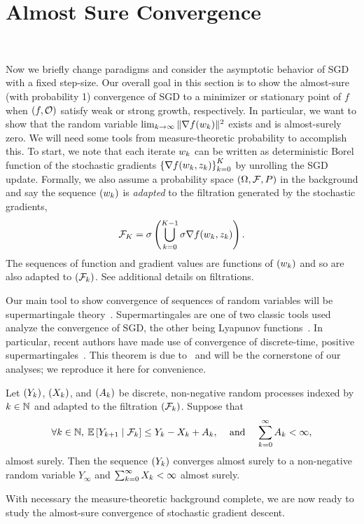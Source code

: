 \section{Almost Sure Convergence}~\label{sec:almost-sure}

Now we briefly change paradigms and consider the asymptotic behavior of SGD with a fixed step-size.
Our overall goal in this section is to show the almost-sure (with probability 1) convergence of SGD to a minimizer or stationary point of \( f \) when \( \rbr{f, \oracle{}} \) satisfy weak or strong growth, respectively.
In particular, we want to show that the random variable \( \lim_{\iter \rightarrow \infty} \norm{\grad(\wk)}^2 \) exists and is almost-surely zero.
We will need some tools from measure-theoretic probability to accomplish this.
To start, we note that each iterate \( \w_k \) can be written as deterministic Borel function of the stochastic gradients \( \cbr{\grad(\wk, \zk)}_{\iter=0}^{K} \) by unrolling the SGD update.
Formally, we also assume a probability space \( \rbr{\Omega,  \calF, P} \) in the background and say the sequence \( \seq{\wk} \) is \emph{adapted} to the filtration generated by the stochastic gradients,
\begin{align*}
    \calF_K = \sigma \rbr{\bigcup_{\iter = 0}^{K-1} \sigma \grad(\wk, \zk)}.
\end{align*}
The sequences of function and gradient values are functions of \( \seq{\wk} \) and so are also adapted to \( \seq{\calF_\iter} \).
See \citet{ccinlar2011probability} additional details on filtrations.

Our main tool to show convergence of sequences of random variables will be supermartingale theory~\citep{ccinlar2011probability}.
Supermartingales are one of two classic tools used analyze the convergence of SGD, the other being Lyapunov functions~\citep{bertsekas2000gradient}.
In particular, recent authors have made use of convergence of discrete-time, positive supermartingales~\citep{bertsekas2011incremental, nguyen2018sgd}.
This theorem is due to~\citet{neveu1975discrete} and will be the cornerstone of our analyses; we reproduce it here for convenience.

\begin{theorem}\label{thm:positive_supermartingales}
    Let \( \seq{Y_\iter} \), \( \seq{X_\iter} \), and \( \seq{A_\iter} \) be discrete, non-negative random processes indexed by \( \iter \in \bbN \) and adapted to the filtration \( \seq{\calF_\iter} \).
    Suppose that
    \begin{align*}
        \forall \iter \in \bbN, \: \E \sbr{Y_{\iter+1} \mid \calF_\iter} \leq Y_\iter - X_\iter + A_\iter,
        && \text{ and } &&
        \sum_{k=0}^{\infty} A_\iter < \infty,
    \end{align*}
    almost surely.
    Then the sequence \( \seq{Y_\iter} \) converges almost surely to a non-negative random variable \( Y_\infty \) and \( \sum_{k=0}^{\infty} X_\iter < \infty \) almost surely.
\end{theorem}
With necessary the measure-theoretic background complete, we are now ready to study the almost-sure convergence of stochastic gradient descent.


